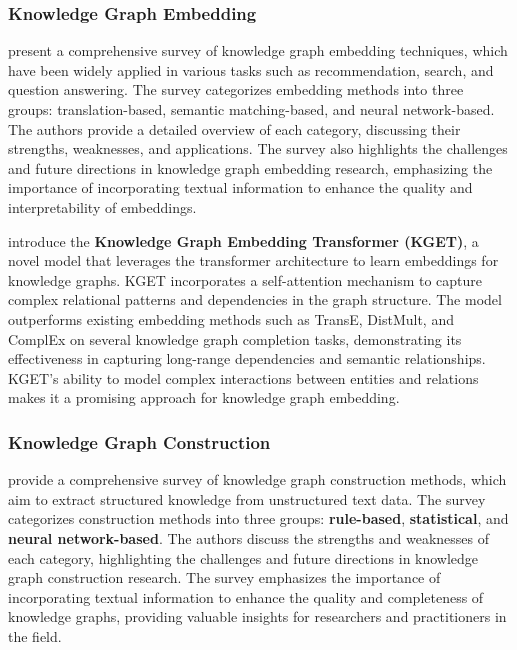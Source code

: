 \documentclass{article}
\begin{document}
\subsubsection{Knowledge Graph Embedding}

\textbf{\cite{guo2020survey}} present a comprehensive survey of knowledge graph
embedding techniques, which have been widely applied in various tasks such as
recommendation, search, and question answering. The survey categorizes
embedding methods into three groups: translation-based, semantic
matching-based, and neural network-based. The authors provide a detailed
overview of each category, discussing their strengths, weaknesses, and
applications. The survey also highlights the challenges and future directions
in knowledge graph embedding research, emphasizing the importance of
incorporating textual information to enhance the quality and interpretability
of embeddings.

\textbf{\cite{zhang2021kget}} introduce the \textbf{Knowledge Graph Embedding
      Transformer (KGET)}, a novel model that leverages the transformer
architecture
to learn embeddings for knowledge graphs. KGET incorporates a self-attention
mechanism to capture complex relational patterns and dependencies in the graph
structure. The model outperforms existing embedding methods such as TransE,
DistMult, and ComplEx on several knowledge graph completion tasks,
demonstrating its effectiveness in capturing long-range dependencies and
semantic relationships. KGET's ability to model complex interactions between
entities and relations makes it a promising approach for knowledge graph
embedding.

\subsubsection{Knowledge Graph Construction}

\textbf{\cite{ji2022survey}} provide a comprehensive survey of knowledge graph
construction methods, which aim to extract structured knowledge from
unstructured text data. The survey categorizes construction methods into three
groups: \textbf{rule-based}, \textbf{statistical}, and \textbf{neural
      network-based}. The authors discuss the strengths and weaknesses of each
category, highlighting the challenges and future directions in knowledge graph
construction research. The survey emphasizes the importance of incorporating
textual information to enhance the quality and completeness of knowledge
graphs, providing valuable insights for researchers and practitioners in the
field.
\end{document}
